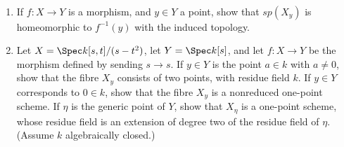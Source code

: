 \begin{exercise}
	~
	\begin{enumerate}
		\item If $f:X \to Y$ is a morphism, and $y \in Y$ a point, show that $sp(X_y)$ is homeomorphic to $f^{-1}(y)$ with the induced topology. 
		\item Let $X = \Spec k[s,t]/(s - t^2)$, let $Y = \Spec k[s]$, and let $f:X \to Y$ be the morphism defined by sending $s \to s$. If $y \in Y$ is the point $a \in k$ with $a \ne 0$, show that the fibre $X_y$ consists of two points, with residue field $k$. If $y \in Y$ corresponds to $0 \in k$, show that the fibre $X_y$ is a nonreduced one-point scheme. If $\eta  $ is the generic point of $Y$, show that $X_\eta$ is a one-point scheme, whose residue field is an extension of degree two of the residue field of $\eta  $. (Assume $k$ algebraically closed.) 
	\end{enumerate}
\end{exercise}
